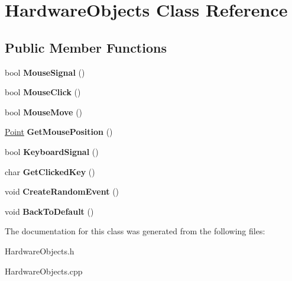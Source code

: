 \hypertarget{classHardwareObjects}{}\section{Hardware\+Objects Class Reference}
\label{classHardwareObjects}
\subsection*{Public Member Functions}
\begin{DoxyCompactItemize}
\item 
\mbox{\label{classHardwareObjects_a8f30f2b7162b5e624d4d9eb0103887b9}} 
bool {\bfseries Mouse\+Signal} ()
\item 
\mbox{\label{classHardwareObjects_a2e08f67779c71674d5117bc54602d86c}} 
bool {\bfseries Mouse\+Click} ()
\item 
\mbox{\label{classHardwareObjects_a5483ef1b5b65714249891b12d098e24b}} 
bool {\bfseries Mouse\+Move} ()
\item 
\mbox{\label{classHardwareObjects_a901245d20a84651d203fe80b7e6a118f}} 
\hyperlink{structPoint}{Point} {\bfseries Get\+Mouse\+Position} ()
\item 
\mbox{\label{classHardwareObjects_a9177dd092805a39d8051cc6895181e31}} 
bool {\bfseries Keyboard\+Signal} ()
\item 
\mbox{\label{classHardwareObjects_ac18f210a0349fad181f87a513a032047}} 
char {\bfseries Get\+Clicked\+Key} ()
\item 
\mbox{\label{classHardwareObjects_ac9324ff0885a776eacedb2e47b4f26af}} 
void {\bfseries Create\+Random\+Event} ()
\item 
\mbox{\label{classHardwareObjects_a1b4210606bbaa5a1296f95a738736c1c}} 
void {\bfseries Back\+To\+Default} ()
\end{DoxyCompactItemize}


The documentation for this class was generated from the following files\+:\begin{DoxyCompactItemize}
\item 
Hardware\+Objects.\+h\item 
Hardware\+Objects.\+cpp\end{DoxyCompactItemize}
